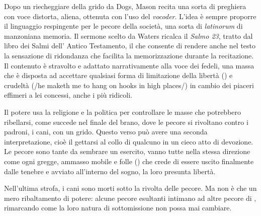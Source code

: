 \documentclass[class=book, crop=false, oneside, 12pt]{standalone}
\begin{document}
    Dopo un riecheggiare della grido  da Dogs, Mason recita una sorta di preghiera con voce distorta, aliena, ottenuta con l'uso del \emph{vocoder}. L'idea è sempre proporre il linguaggio respingente per le pecore della società, una sorta di \emph{latinorum} di manzoniana memoria. Il sermone scelto da Waters ricalca il \emph{Salmo 23}, tratto dal libro dei Salmi dell' Antico Testamento, il che consente di rendere anche nel testo la sensazione di ridondanza che facilita la memorizzazione durante la recitazione. Il contenuto è stravolto e adattato narrativamente alla voce dei  fedeli, una massa che è disposta ad accettare qualsiasi forma di limitazione della libertà () e crudeltà (/he maketh me to hang on hooks in high places/) in cambio dei piaceri effimeri a lei concessi, anche i più ridicoli.

    Il potere usa la religione e la politica per controllare le masse che potrebbero ribellarsi, come succede nel finale del brano, dove le pecore si rivoltano contro i padroni, i cani, con un grido. Questo verso può avere una seconda interpretazione, cioè il gettarsi al collo di qualcuno in un cieco atto di devozione. Le pecore sono tante da sembrare un esercito, vanno tutte nella stessa direzione come ogni gregge, ammasso mobile e folle () che crede di essere uscito finalmente dalle tenebre e avviato all'interno del sogno, la loro presunta libertà.

    Nell'ultima strofa, i cani sono morti sotto la rivolta delle pecore. Ma non è che un mero ribaltamento di potere: alcune pecore esultanti intimano ad altre pecore di , rimarcando come la loro natura di sottomissione non possa mai cambiare.
\end{document}
